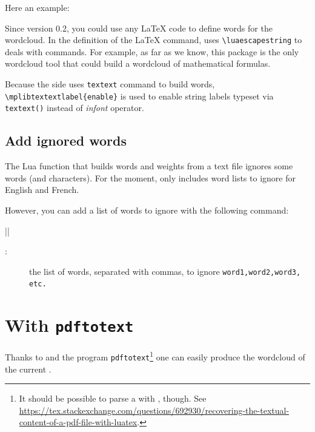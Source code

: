 \documentclass[english]{ltxdoc}
\begin{document}
Here an example:
\begin{ExempleLaTeX} 
\end{ExempleLaTeX}

Since version 0.2, you could use any \LaTeX{} code to define words for the
wordcloud. In the definition of the \LaTeX{} command, \wordcloudpkg{} uses
\lstinline+\luaescapestring+ to deals with commands. For example, as far as we
know,  this \wordcloudpkg package is the only wordcloud tool that could build a
wordcloud of mathematical formulas. 

\begin{remark}
  Because the  side uses \lstinline+textext+ command to build
  words, \lstinline+\mplibtextextlabel{enable}+ is used to enable string labels
  typeset via \lstinline+textext()+ instead of \emph{infont} operator.
\end{remark}

\subsection{Add ignored words}

The Lua function that builds words and weights from a text file ignores some
words (and characters). For the moment,  only includes word
lists to ignore for English and French.

However, you can add a list of words to ignore with the following command:

\commande||\smallskip\index{\wordcloudIgnoreWords@\lstinline+\wordcloudIgnoreWords+}

\begin{description}
  \item[:] the list of words, separated with commas, to ignore
  \lstinline+word1,word2,word3, etc.+
\end{description}

  
\section{With \texttt{pdftotext}}

Thanks to  and the program \texttt{pdftotext}\footnote{It
should be possible to parse a \pdf{} with , though. See \url{https://tex.stackexchange.com/questions/692930/recovering-the-textual-content-of-a-pdf-file-with-luatex}.} one can
easily produce the wordcloud of the current \pdf. 
\end{document}
